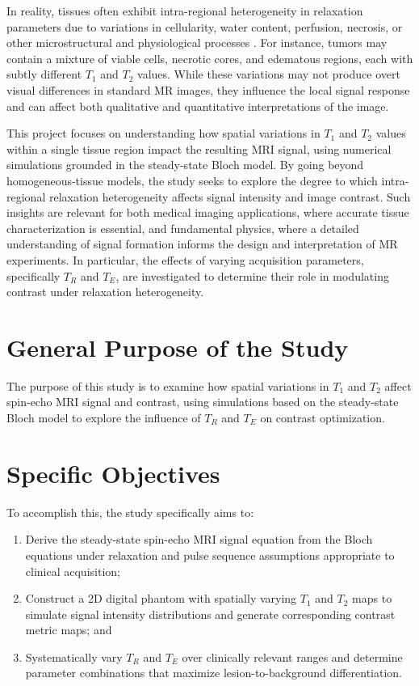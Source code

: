 \documentclass[10pt,a4paper,twoside]{article}
\begin{document}
In reality, tissues often exhibit intra-regional heterogeneity in relaxation parameters due to variations in cellularity, water content, perfusion, necrosis, or other microstructural and physiological processes \cite{tofts2003}. For instance, tumors may contain a mixture of viable cells, necrotic cores, and edematous regions, each with subtly different $T_1$ and $T_2$ values. While these variations may not produce overt visual differences in standard MR images, they influence the local signal response and can affect both qualitative and quantitative interpretations of the image.

This project focuses on understanding how spatial variations in $T_1$ and $T_2$ values within a single tissue region impact the resulting MRI signal, using numerical simulations grounded in the steady-state Bloch model. By going beyond homogeneous-tissue models, the study seeks to explore the degree to which intra-regional relaxation heterogeneity affects signal intensity and image contrast. Such insights are relevant for both medical imaging applications, where accurate tissue characterization is essential, and fundamental physics, where a detailed understanding of signal formation informs the design and interpretation of MR experiments. In particular, the effects of varying acquisition parameters, specifically $T_R$ and $T_E$, are  investigated to determine their role in modulating contrast under relaxation heterogeneity.

\section{General Purpose of the Study}\label{sec:generalobjectives}
The purpose of this study is to examine how spatial variations in $T_1$ and $T_2$ affect spin-echo MRI signal and contrast, using simulations based on the steady-state Bloch model to explore the influence of $T_R$ and $T_E$ on contrast optimization.

\section{Specific Objectives}\label{sec:specificobjectives}
To accomplish this, the study specifically aims to:
\begin{enumerate}
    \item Derive the steady-state spin-echo MRI signal equation from the Bloch equations under relaxation and pulse sequence assumptions appropriate to clinical acquisition;
    \item Construct a 2D digital phantom with spatially varying $T_1$ and $T_2$ maps to simulate signal intensity distributions and generate corresponding contrast metric maps; and
    \item Systematically vary $T_R$ and $T_E$ over clinically relevant ranges and determine parameter combinations that maximize lesion-to-background differentiation.
\end{enumerate}
\end{document}
